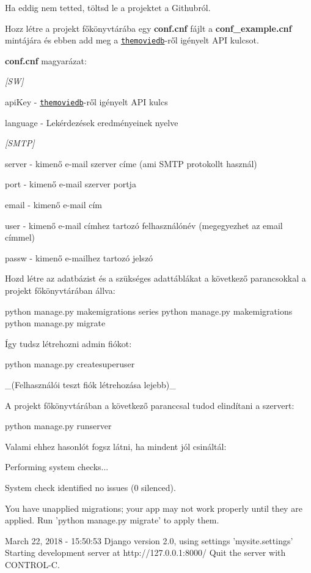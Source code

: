 Ha eddig nem tetted, töltsd le a projektet a Githubról.

Hozz létre a projekt főkönyvtárába egy {\bfseries conf.\+cnf} fájlt a {\bfseries conf\+\_\+example.\+cnf} mintájára és ebben add meg a \href{https://www.themoviedb.org}{\tt themoviedb}-\/ről igényelt A\+PI kulcsot.

{\bfseries conf.\+cnf} magyarázat\+:

{\itshape \mbox{[}SW\mbox{]}}
\begin{DoxyItemize}
\item api\+Key -\/ \href{https://www.themoviedb.org}{\tt themoviedb}-\/ről igényelt A\+PI kulcs
\item language -\/ Lekérdezések eredményeinek nyelve
\end{DoxyItemize}

{\itshape \mbox{[}S\+M\+TP\mbox{]}}
\begin{DoxyItemize}
\item server -\/ kimenő e-\/mail szerver címe (ami S\+M\+TP protokollt használ)
\item port -\/ kimenő e-\/mail szerver portja
\item email -\/ kimenő e-\/mail cím
\item user -\/ kimenő e-\/mail címhez tartozó felhasználónév (megegyezhet az email címmel)
\item passw -\/ kimenő e-\/mailhez tartozó jelszó
\end{DoxyItemize}

Hozd létre az adatbázist és a szükséges adattáblákat a következő parancsokkal a projekt főkönyvtárában állva\+: 
\begin{DoxyCode}
python manage.py makemigrations series
python manage.py makemigrations
python manage.py migrate
\end{DoxyCode}
 Így tudsz létrehozni admin fiókot\+: 
\begin{DoxyCode}
python manage.py createsuperuser
\end{DoxyCode}
 \+\_\+(Felhasználói teszt fiók létrehozása lejebb)\+\_\+

A projekt főkönyvtárában a következő paranccsal tudod elindítani a szervert\+: 
\begin{DoxyCode}
python manage.py runserver
\end{DoxyCode}
 Valami ehhez hasonlót fogsz látni, ha mindent jól csináltál\+: 
\begin{DoxyCode}
Performing system checks...

System check identified no issues (0 silenced).

You have unapplied migrations; your app may not work properly until they are applied.
Run 'python manage.py migrate' to apply them.

March 22, 2018 - 15:50:53
Django version 2.0, using settings 'mysite.settings'
Starting development server at http://127.0.0.1:8000/
Quit the server with CONTROL-C.
\end{DoxyCode}


